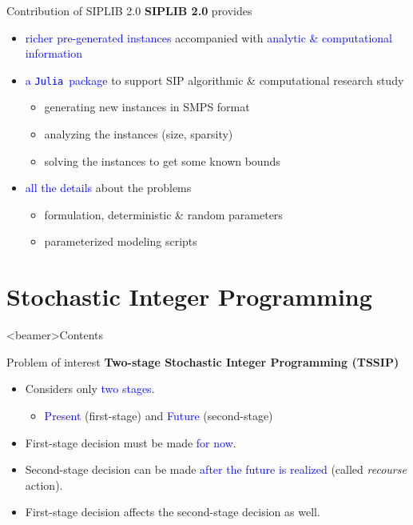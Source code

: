 \documentclass{beamer}
\newcommand{\siplibtwo}{\textsf{SIPLIB 2.0}}
\newcommand{\julia}{\texttt{Julia}}
\begin{document}
	\begin{frame}{Contribution of \siplibtwo}
		\textbf{\siplibtwo} provides
		\begin{itemize}
			\item \textcolor{blue}{richer pre-generated instances} accompanied with \textcolor{blue}{analytic \& computational information}
			\item \textcolor{blue}{a \julia\ package} to support SIP algorithmic \& computational research study
			\begin{itemize}
				\item generating new instances in SMPS format
				\item analyzing the instances (size, sparsity)
				\item solving the instances to get some known bounds
			\end{itemize}
			\item \textcolor{blue}{all the details} about the problems
			\begin{itemize}
				\item formulation, deterministic \& random parameters
				\item parameterized modeling scripts
			\end{itemize}
		\end{itemize}
	\end{frame}
	
	\section{Stochastic Integer Programming}
	
	\begin{frame}<beamer>{Contents}
	\end{frame}
	
	\begin{frame}{Problem of interest}
	\textbf{{Two-stage Stochastic Integer Programming (TSSIP)}}
	\begin{itemize}
		\item Considers only \textcolor{blue}{two stages}.
			\begin{itemize}
				\item \textcolor{blue}{Present} (first-stage) and \textcolor{blue}{Future} (second-stage)
			\end{itemize} 
		\item First-stage decision must be made \textcolor{blue}{for now}.
		\item Second-stage decision can be made \textcolor{blue}{after the future is realized} (called \textit{recourse} action).
		\item First-stage decision affects the second-stage decision as well.
	\end{itemize}
	\end{frame}
	
\end{document}
